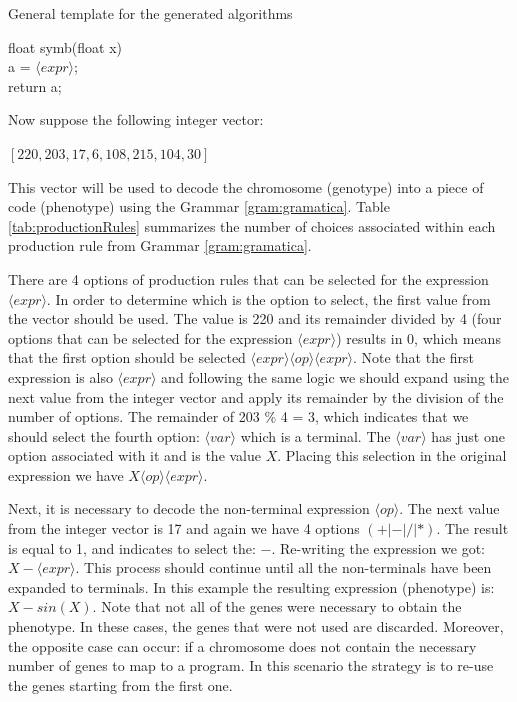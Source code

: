 \documentclass[conference]{IEEEtran}
\begin{document}
\begin{algorithm}
	\caption{General template for the generated algorithms}
	\label{alg:pseudocodigogrammar}
	float symb(float x) { \\
		a = $\langle expr \rangle$;   \\
		return a;  \\
	}	
\end{algorithm}


\noindent
Now suppose the following integer vector:

\begin{center}
	$ [220, 203, 17, 6, 108, 215, 104, 30] $
\end{center}

This vector will be used to decode the chromosome (genotype) into a piece of code (phenotype)  using the Grammar \ref{gram:gramatica}.
Table \ref{tab:productionRules} summarizes the number of choices associated within each production rule from Grammar \ref{gram:gramatica}. 

There are 4 options of production rules that can be selected for the expression $ \langle expr \rangle$. In order to determine which is the option to select, the first value from the vector should be used. The value is 220 and its remainder divided by 4 (four options that can be selected for the expression $ \langle expr \rangle$) results in 0, which means that the first option should be selected $\langle expr \rangle \langle op \rangle \langle expr \rangle$. Note that the first expression is also $ \langle expr \rangle$ and following the same logic we should expand using the next value from the integer vector and apply its remainder by the division of the number of options. The remainder of 203 $\%$ 4 = 3, which indicates that we should select the fourth option: $ \langle var \rangle$ which is a terminal. The $ \langle var \rangle$ has just one option associated with it and is the value $X$. Placing this selection in the original expression we have $X \langle op \rangle \langle expr \rangle$. 

Next, it is necessary to decode the non-terminal expression $\langle op \rangle$. The next value from the integer vector is 17 and again we have 4 options $(+ | - | / | *)$. The result is equal to 1, and indicates to select the: $-$. Re-writing the expression we got:  $X  -  \langle expr \rangle$. This process should continue until all the non-terminals have been expanded to terminals. In this example the resulting expression (phenotype) is: $X - sin (X)$. Note that not all of the genes were necessary to obtain the phenotype. In these cases, the genes that were not used are discarded. Moreover, the opposite case can occur: if a chromosome does not contain the necessary number of genes to map to a program. In this scenario the strategy is to re-use the genes starting from the first one.
\end{document}
